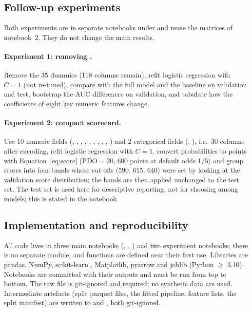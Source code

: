 \subsection{Follow-up experiments}
\label{sec:exp}

Both experiments are in separate notebooks under  and reuse the matrices of notebook~2. They do not change the main results.

\paragraph{Experiment 1: removing .} Remove the 35  dummies (118 columns remain), refit logistic regression with $C=1$ (not re-tuned), compare with the full model and the baseline on validation and test, bootstrap the AUC differences on validation, and tabulate how the coefficients of eight key numeric features change.

\paragraph{Experiment 2: compact scorecard.} Use 10 numeric fields (, , , , , , , , , ) and 2 categorical fields (, ), i.e.\ 30 columns after encoding, refit logistic regression with $C=1$, convert probabilities to points with Equation~\eqref{eq:score} ($\mathrm{PDO}=20$, 600 points at default odds 1/5) and group scores into four bands whose cut-offs (590, 615, 640) were set by looking at the validation score distribution; the bands are then applied unchanged to the test set. The test set is used here for descriptive reporting, not for choosing among models; this is stated in the notebook.

\subsection{Implementation and reproducibility}

All code lives in three main notebooks (, , ) and two experiment notebooks; there is no separate  module, and functions are defined near their first use. Libraries are pandas, NumPy, scikit-learn \cite{pedregosa2011}, Matplotlib, pyarrow and joblib (Python $\ge$ 3.10). Notebooks are committed with their outputs and must be run from top to bottom. The raw file is git-ignored and required; no synthetic data are used. Intermediate artefacts (split parquet files, the fitted pipeline, feature lists, the split manifest) are written to  and , both git-ignored.

